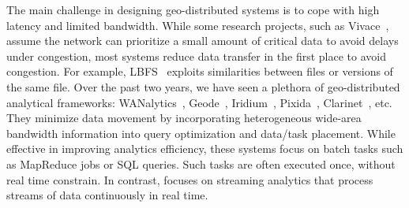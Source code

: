  The main challenge in designing geo-distributed
systems is to cope with high latency and limited bandwidth. While some research
projects, such as Vivace~\cite{cho2012surviving}, assume the network can
prioritize a small amount of critical data to avoid delays under congestion,
most systems reduce data transfer in the first place to avoid congestion. For
example, LBFS~\cite{muthitacharoen2001low} exploits similarities between files
or versions of the same file. Over the past two years, we have seen a plethora
of geo-distributed analytical frameworks:
WANalytics~\cite{vulimiri2015wananlytics}, Geode~\cite{vulimiri2015global},
Iridium~\cite{pu2015low}, Pixida~\cite{kloudas2015pixida},
Clarinet~\cite{viswanathan2016clarinet}, etc. They minimize data movement by
incorporating heterogeneous wide-area bandwidth information into query
optimization and data/task placement. While effective in improving analytics
efficiency, these systems focus on batch tasks such as MapReduce jobs or
SQL queries. Such tasks are often executed once, without real time constrain. In
contrast, \sysname{} focuses on streaming analytics that process streams of data
continuously in real time.









